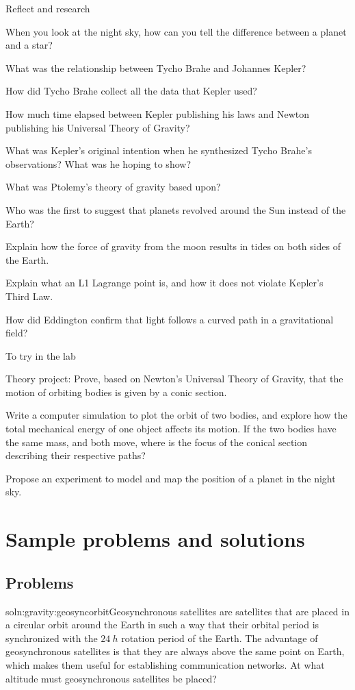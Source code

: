 \begin{chapteractivity}{Reflect and research}
{
\item When you look at the night sky, how can you tell the difference between a planet and a star?
\item What was the relationship between Tycho Brahe and Johannes Kepler?
\item How did Tycho Brahe collect all the data that Kepler used?
\item How much time elapsed between Kepler publishing his laws and Newton publishing his Universal Theory of Gravity?
\item What was Kepler's original intention when he synthesized Tycho Brahe's observations? What was he hoping to show?
\item What was Ptolemy's theory of gravity based upon?
\item Who was the first to suggest that planets revolved around the Sun instead of the Earth?
\item Explain how the force of gravity from the moon results in tides on both sides of the Earth.
\item Explain what an L1 Lagrange point is, and how it does not violate Kepler's Third Law.
\item How did Eddington confirm that light follows a curved path in a gravitational field?
}
\end{chapteractivity}

\begin{chapteractivity}{To try in the lab}
{
\item Theory project: Prove, based on Newton's Universal Theory of Gravity, that the motion of orbiting bodies is given by a conic section. 
\item Write a computer simulation to plot the orbit of two bodies, and explore how the total mechanical energy of one object affects its motion. If the two bodies have the same mass, and both move, where is the focus of the conical section describing their respective paths?
\item Propose an experiment to model and map the position of a planet in the night sky.
}
\end{chapteractivity}
\newpage
\section{Sample problems and solutions}
\subsection{Problems}
\begin{problem}{soln:gravity:geosyncorbit}{\label{prob:gravity:geosyncorbit}Geosynchronous satellites are satellites that are placed in a circular orbit around the Earth in such a way that their orbital period is synchronized with the $\SI{24}{h}$ rotation period of the Earth. The advantage of geosynchronous satellites is that they are always above the same point on Earth, which makes them useful for establishing communication networks. At what altitude must geosynchronous satellites be placed?}
\end{problem}

